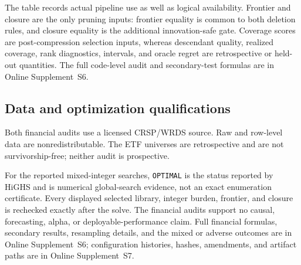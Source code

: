 The table records actual pipeline use as well as logical availability.
Frontier and closure are the only pruning inputs: frontier equality is common
to both deletion rules, and closure equality is the additional
innovation-safe gate.  Coverage scores are post-compression selection inputs,
whereas descendant quality, realized coverage, rank diagnostics, intervals,
and oracle regret are retrospective or held-out quantities.  The full
code-level audit and secondary-test formulas are in Online Supplement~S6.

\subsection{Data and optimization qualifications}
\label{app:protocol-qualifications}

Both financial audits use a licensed CRSP/WRDS source.  Raw and row-level data
are nonredistributable.  The ETF universes are retrospective and are not
survivorship-free; neither audit is prospective.

For the reported mixed-integer searches, \texttt{OPTIMAL} is the status
reported by HiGHS and is numerical global-search evidence, not an exact
enumeration certificate.  Every displayed selected library, integer burden,
frontier, and closure is rechecked exactly after the solve.  The financial
audits support no causal, forecasting, alpha, or deployable-performance claim.
Full financial formulas, secondary results, resampling details, and the mixed
or adverse outcomes are in Online Supplement~S6; configuration histories,
hashes, amendments, and artifact paths are in Online Supplement~S7.
